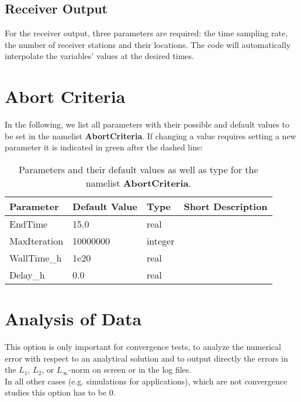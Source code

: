 \documentclass[12pt,twoside]{article}
\begin{document}
\subsection{Receiver Output}
\label{sec-block-rec}

For the receiver output, three parameters are required:
the time sampling rate, the number of receiver stations and their locations.
The code will automatically interpolate the variables' values at the desired times.

\newpage

\section{Abort Criteria}
\label{sec-block-abo}

In the following, we list all parameters with their possible and default values to be set in the namelist \textbf{AbortCriteria}.
If changing a value requires setting a new parameter it is indicated in green after the dashed line:\\

\begin{table}[H]
\caption{Parameters and their default values as well as type for the namelist \textbf{AbortCriteria}.}
\begin{center}
\begin{tabular}{|p{4cm}|p{2.7cm}|p{2cm}|p{4cm}|}
\hline
Parameter & Default Value & Type & Short Description \\
\hline
\hline
EndTime & 15.0 & real &  \\
MaxIteration & 10000000 & integer &  \\
WallTime\_h & 1e20 & real &  \\
Delay\_h & 0.0 & real &  \\
\hline
\end{tabular}
\end{center}
\label{abort-table}
\end{table}

\newpage



\section{Analysis of Data}
\label{sec-block-ana}

This option is only important for convergence tests, to analyze the numerical error with respect to
an analytical solution and to output directly the errors in the $L_1$, $L_2$, or $L_\infty$-norm on
screen or in the log files.\\
In all other cases (e.g. simulations for applications), which are not convergence studies this option
has to be $0$.
\end{document}
